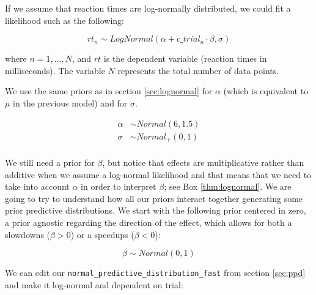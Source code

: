 \documentclass[12pt,]{krantz}
\theoremstyle{definition}
\theoremstyle{definition}
\theoremstyle{definition}
\theoremstyle{remark}
\begin{document}
If we assume that reaction times are log-normally distributed, we could fit a likelihood such as the following:

\begin{equation}
rt_n \sim LogNormal(\alpha + c\_trial_n \cdot \beta,\sigma)
\label{eq:rtloglik}
\end{equation}

where \(n =1, \ldots, N\), and \(rt\) is the dependent variable (reaction times in milliseconds). The variable \(N\) represents the total number of data points.

We use the same priors as in section \ref{sec:lognormal} for \(\alpha\) (which is equivalent to \(\mu\) in the previous model) and for \(\sigma\).

\begin{equation}
\begin{aligned}
\alpha &\sim Normal(6, 1.5) \\
\sigma &\sim Normal_+(0, 1)\\
\end{aligned}
\end{equation}

We still need a prior for \(\beta\), but notice that effects are multiplicative rather than additive when we assume a log-normal likelihood and that means that we need to take into account \(\alpha\) in order to interpret \(\beta\); see Box \ref{thm:lognormal}. We are going to try to understand how all our priors interact together generating some prior predictive distributions. We start with the following prior centered in zero, a prior agnostic regarding the direction of the effect, which allows for both a slowdowns (\(\beta>0\)) or a speedups (\(\beta<0\)):

\begin{equation}
\beta \sim Normal(0, 1)
\end{equation}

We can edit our \texttt{normal\_predictive\_distribution\_fast} from section \ref{sec:ppd} and make it log-normal and dependent on trial:
\end{document}
